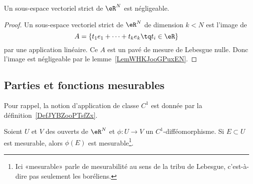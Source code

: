 \begin{corollary}
    Un sous-espace vectoriel strict de \( \eR^N\) est négligeable.
\end{corollary}

\begin{proof}
    Un sous-espace vectoriel strict de \( \eR^N\) de dimension \( k<N\) est l'image de
    \begin{equation}
        A=\{ t_1e_1+\cdots +t_ke_k\tq t_i\in \eR \}
    \end{equation}
    par une application linéaire. Ce \( A\) est un pavé de mesure de Lebesgue nulle. Donc l'image est négligeable par le lemme~\ref{LemWHKJooGPuxEN}.
\end{proof}

\subsection{Parties et fonctions mesurables}

Pour rappel, la notion d'application de classe \( C^1\) est donnée par la définition~\ref{DefJYBZooPTsfZx}.

\begin{proposition}     \label{PropRDRNooFnZSKt}
    Soient \( U\) et \( V\) des ouverts de \( \eR^N\) et \( \phi\colon U\to V\) un \( C^1\)-difféomorphisme. Si \( E\subset U\) est mesurable, alors \( \phi(E)\) est mesurable\footnote{Ici «mesurable» parle de mesurabilité au sens de la tribu de Lebesgue, c'est-à-dire pas seulement les boréliens.}.
\end{proposition}

